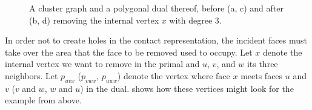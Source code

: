 \begin{figure}[H]
	\centering
	\quad
	\qquad
	\quad
	\caption{A cluster graph and a polygonal dual thereof, before (a, c) and after (b, d) removing the internal vertex $x$ with degree 3.}
	\label{fig:remove-vertex-example-internal}
\end{figure}

In order not to create holes in the contact representation, the incident faces must take over the area that the face to be removed used to occupy.
Let $x$ denote the internal vertex we want to remove in the primal and $u$, $v$, and $w$ its three neighbors.
Let $p_{uvx}$ ($p_{vwx}$, $p_{uwx}$) denote the vertex where face $x$ meets faces $u$ and $v$ ($v$ and $w$, $w$ and $u$) in the dual.
 shows how these vertices might look for the example from above.

